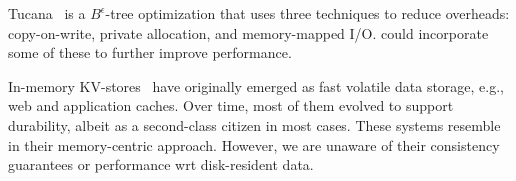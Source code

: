 Tucana~\cite{tucana} is a $B^{\epsilon}$-tree optimization that uses three techniques to reduce overheads: copy-on-write, 
private allocation, and memory-mapped I/O. \sys\/ could incorporate some of these to further improve performance. 

In-memory KV-stores~\cite{ignite, redis, memcached, Srinivasan:2016:AAR:3007263.3007276} have originally emerged as fast volatile 
data storage, e.g., web and application caches. Over time, most of them evolved to support durability,
albeit as a second-class citizen in most cases. 
These systems resemble \sys\/ in their memory-centric approach. 
However, we are unaware of their consistency guarantees or performance wrt disk-resident data. 

